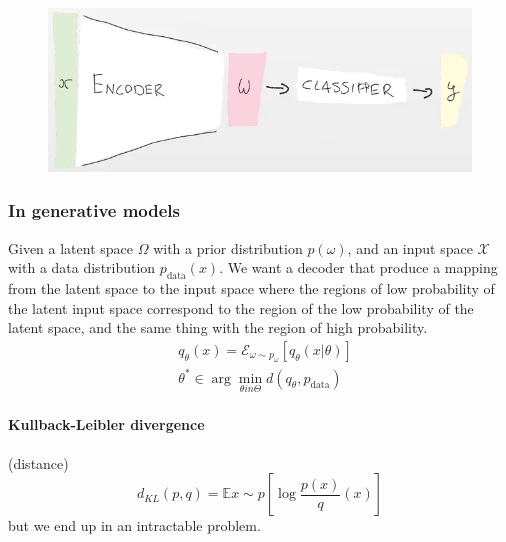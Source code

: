\documentclass[a4paper,6pt,twocolumn,fleqn]{article}
\begin{document}
\begin{figure}[h!]
    \vspace{-10pt}
	\begin{center}
    \includegraphics[width=.4\textwidth]{084}
    \end{center}
    \vspace{-20pt}
\end{figure}

\subsubsection{In generative models} %
Given a latent space \(\Omega\) with a prior distribution \(p(\omega)\), and an input space \(\mathcal X\) with a data distribution \(p_\text{data}(x)\). We want a decoder that produce a mapping from the latent space to the input space where the regions of low probability of the latent input space correspond to the region of the low probability of the latent space, and the same thing with the region of high probability.
\begin{align}
    & q_\theta (x) = \mathcal E_{\omega \sim p_\omega}[ q_\theta (x | \theta) ]\\
    & \theta^* \in \arg \min_{\theta in \Theta} d(q_\theta, p_\text{data})
\end{align}
\paragraph{Kullback-Leibler divergence} (distance)
\begin{equation}
    d_{KL} (p,q) = \mathbb E{x \sim p} \left[\log \frac {p(x)} q(x) \right]
\end{equation}
but we end up in an intractable problem.
\end{document}
